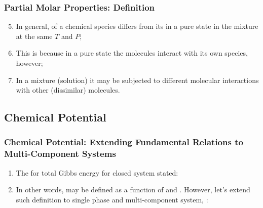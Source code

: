 \documentclass[10pt,compress,unknownkeysallowed]{beamer}
\begin{document}
\begin{frame}
  \frametitle{Partial Molar Properties: Definition}
  \begin{enumerate}\setcounter{enumi}{4}
    \item<1-> In general,  of a chemical species differs from its  in a pure state in the mixture at the same $T$ and $P$; %
    \item<2-> This is because in a pure state the molecules interact with its own species, however;
    \item<3-> In a mixture (\ie solution) it may be subjected to different molecular interactions with other (dissimilar) molecules. 
  \end{enumerate}
\end{frame}
\normalsize

\subsection{Chemical Potential}  

\begin{frame}
  \frametitle{Chemical Potential: Extending Fundamental Relations to Multi-Component Systems} 
  \begin{enumerate}
    \item<1-> The  for total Gibbs energy  for closed system stated:
     \item<2-> In other words,  may be defined as a function of  and . However, let's extend such definition to single phase and multi-component system, \ie {}:
  \end{enumerate}
\end{frame}
\normalsize
  
\end{document}
